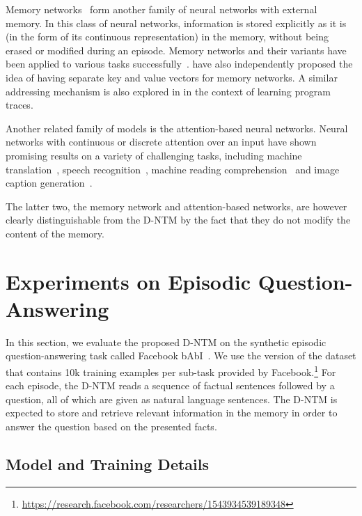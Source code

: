 \documentclass[12pt]{article}
\begin{document}
Memory networks~\citep{weston2014memory} form another family of neural networks
with external memory. In this class of neural networks, information is stored
explicitly as it is (in the form of its continuous representation) in the
memory, without being erased or modified during an episode. Memory networks and
their variants have been applied to various tasks
successfully~\citep{sukhbaatarend,bordes2015large,dodge2015,dmn2, chandar2016hierarchical}. \cite{keyval} 
have also independently proposed the idea of having separate key and value vectors for memory networks. A similar addressing mechanism is also explored in \citep{reed2015neural} in the context of learning program traces.


Another related family of models is the attention-based neural networks. Neural
networks with continuous or discrete attention over an input have shown promising results
on a variety of challenging tasks, including machine
translation~\citep{bahdanau2014neural,luong2015effective}, speech
recognition~\citep{chorowski2015attention}, machine reading
comprehension~\citep{hermann2015teaching} and image caption
generation~\citep{xu2015show}.  

The latter two, the memory network and attention-based networks, are however
clearly distinguishable from the D-NTM by the fact that they do not modify the
content of the memory.  





\section{Experiments on Episodic Question-Answering}

In this section, we evaluate the proposed D-NTM on the synthetic episodic
question-answering task called Facebook bAbI~\citep{weston2015towards}. We use
the version of the dataset that contains 10k training examples per sub-task provided by
Facebook.\footnote{
    \url{https://research.facebook.com/researchers/1543934539189348}
} For each episode, the D-NTM reads a sequence of factual sentences followed by a
question, all of which are given as natural language sentences. The D-NTM is
expected to store and retrieve relevant information in the memory in order to
answer the question based on the presented facts. 

\subsection{Model and Training Details}
\end{document}
